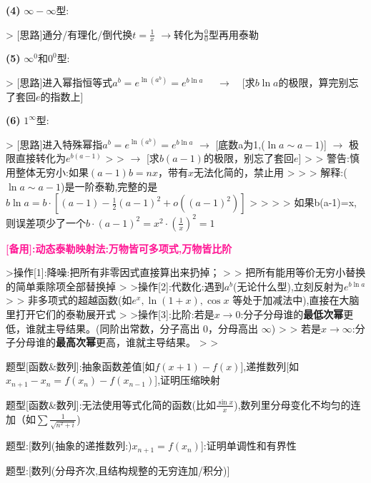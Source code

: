 \documentclass[11pt,a4paper,UTF8]{ctexart}
\begin{document}
\begin{thmbox}[{解法[6]: [微分]7种未定式计算}]
\textbf{(4)} $\infty - \infty$型:

    >   [思路]通分/有理化/倒代换$t = \frac{1}{x}$ $\to$转化为$\frac{0}{0}$型再用泰勒

\textbf{(5)} $\infty^0$和$0^0$型:

    >   [思路]进入幂指恒等式$a^b = e^{\ln(a^b)} = e^{b \ln a}$ $\quad\to\quad$[求$b \ln a$的极限，算完别忘了套回$e$的指数上]

\textbf{(6)} $1^\infty$型:

    >   [思路]进入特殊幂指$a^b = e^{\ln(a^b)} = e^{b \ln a}$   $\to$  [底数a为1,($\ln a \sim a - 1$)]  $\to$  极限直接转化为$e^{b(a-1)}$
    >
    >   				   $\to$  [求$b(a-1)$的极限，别忘了套回$e$]
    >
    >   警告:慎用整体无穷小:如果$(a-1)b = nx$，带有$x$无法化简的，禁止用
    >
    >   >   解释:($\ln a \sim a - 1$)是一阶泰勒,完整的是$b \ln a = b \cdot [(a-1) - \frac{1}{2}(a-1)^2 + o((a-1)^2)]$
    >   >
    >   >   如果b(a-1)=x,则误差项少了一个$b \cdot (a-1)^2 = x^2 \cdot (\frac{1}{x})^2 = 1$

    \textbf{\textcolor{DeepPink}{[备用]:动态泰勒映射法:万物皆可多项式,万物皆比阶}}

    >操作[1]:降噪:把所有非零因式直接算出来扔掉；
    >
    >	    把所有能用等价无穷小替换的简单乘除项全部替换掉
    >
    >操作[2]:代数化:遇到$a^b$(无论什么型),立刻反射为$e^{b \ln a}$
    >
    >	      非多项式的超越函数(如$e^x, \ln(1+x), \cos x$ 等处于加减法中),直接在大脑里打开它们的泰勒展开式
    >
    >操作[3]:比阶:若是$x \to 0$:分子分母谁的\textbf{最低次幂}更低，谁就主导结果。(同阶出常数，分子高出 $0$，分母高出 $\infty$)
    >
    >           若是$x \to \infty$:分子分母谁的\textbf{最高次幂}更高，谁就主导结果。
    >
    >

\end{thmbox}
\begin{thmbox}[{解法[7]: [降维]微分/积分中值定理}]

    题型[函数\&数列]:抽象函数差值[如$f(x+1) - f(x)$],递推数列[如$x_{n+1} - x_n = f(x_n) - f(x_{n-1})$],证明压缩映射

\end{thmbox}
\begin{thmbox}[{解法[8]: [夹逼]夹逼定理}]

    题型[函数\&数列]:无法使用等式化简的函数(比如$\frac{\sin x}{x}$),数列里分母变化不均匀的连加（如$\sum \frac{1}{\sqrt{n^2+i}}$)

\end{thmbox}
\begin{thmbox}[{解法[9]: [夹逼]单调有界准则}]

    题型:[数列(抽象的递推数列:)$x_{n+1} = f(x_n)$]:证明单调性和有界性

\end{thmbox}
\begin{thmbox}[{解法[10]: [夹逼]定积分定义}]

    题型:[数列(分母齐次,且结构规整的无穷连加/积分)]

\end{thmbox}
\end{document}
